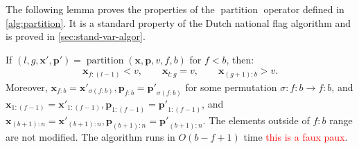 \documentclass[10pt]{article} %
\newcommand{\gersi}[1]{\textcolor{red}{#1}}
\begin{document}
The following lemma proves the properties of the $\operatorname{partition}$ operator defined in \cref{alg:partition}. It is a standard property of the Dutch national flag algorithm and is proved in \cref{sec:stand-var-algor}.
\begin{lemma} \label{lem:hoare-partition}
If $(l, g, \bm{x}', \bm{p}') = \operatorname{partition}(\bm{x}, \bm{p}, v, f, b)$ for $f < b$, then:
\begin{align} \label{eq:hoare-correspond}
  \bm{x}_{f{:}(l-1)} < v, \qquad
  \bm{x}_{l{:}g} = v,  \qquad
  \bm{x}_{(g+1){:}b} > v.
\end{align}
Moreover, $ \bm{x}_{f{:}b} = \bm{x'}_{\sigma(f{:}b)}, \bm{p}_{f{:}b} = \bm{p'}_{\sigma(f{:}b)}$ for some permutation $\sigma\colon f{:}b \to f{:}b$, and $\bm{x}_{1{:}(f-1)} = \bm{x'}_{1{:}(f-1)}, \bm{p}_{1{:}(f-1)} = \bm{p'}_{1{:}(f-1)}$, and $\bm{x}_{(b+1):n} = \bm{x'}_{(b+1):n}, \bm{p}_{(b+1):n} = \bm{p'}_{(b+1):n}$. The elements outside of $f{:}b$ range are not modified. The algorithm runs in $O(b - f + 1)$ time \gersi{this is a faux paux}.
\end{lemma}
\end{document}
